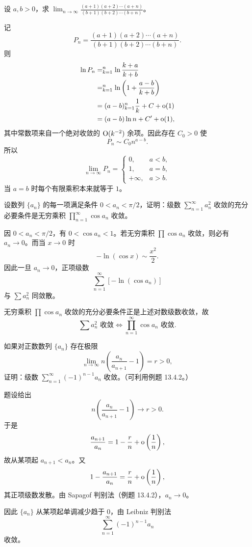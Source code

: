 \begin{xexercise}[2]
设 $a,b>0$，求 $\lim_{n\to\infty}\frac{(a+1)(a+2)\cdots(a+n)}{(b+1)(b+2)\cdots(b+n)}$。
\end{xexercise}
\begin{xsolution}
记
\[
 P_n=\frac{(a+1)(a+2)\cdots(a+n)}{(b+1)(b+2)\cdots(b+n)}.
\]
则
\[
 \begin{aligned}
 \ln P_n
 &=\relax_{k=1}^{n}\ln\frac{k+a}{k+b}\\
 &=\relax_{k=1}^{n}\ln\left(1+\frac{a-b}{k+b}\right)\\
 &=(a-b)\relax_{k=1}^{n}\frac1k+C+\mathrm{o}(1)\\
 &=(a-b)\ln n+C'+\mathrm{o}(1),
 \end{aligned}
\]
其中常数项来自一个绝对收敛的 $\relax\mathrm{O}(k^{-2})$ 余项。因此存在 $C_0>0$ 使
\[
 P_n\sim C_0n^{a-b}.
\]
所以
\[
 \boxed{
 \lim_{n\to\infty}P_n=
 \begin{cases}
 0,&a<b,\\
 1,&a=b,\\
 +\infty,&a>b.
 \end{cases}}
\]
当 $a=b$ 时每个有限乘积本来就等于 $1$。
\end{xsolution}


\begin{xexercise}[3]
设数列 $\{a_n\}$ 的每一项满足条件 $0<a_n<\pi/2$，证明：级数 $\sum_{n=1}^{\infty}a_n^2$ 收敛的充分必要条件是无穷乘积 $\prod_{n=1}^{\infty}\cos a_n$ 收敛。
\end{xexercise}
\begin{xsolution}
因 $0<a_n<\pi/2$，有 $0<\cos a_n<1$。若无穷乘积 $\prod\cos a_n$ 收敛，则必有 $a_n\to0$。而当 $x\to0$ 时
\[
 -\ln(\cos x)\sim\frac{x^2}{2}.
\]
因此一旦 $a_n\to0$，正项级数
\[
 \sum_{n=1}^{\infty}[-\ln(\cos a_n)]
\]
与 $\sum a_n^2$ 同敛散。

无穷乘积 $\prod\cos a_n$ 收敛的充分必要条件正是上述对数级数收敛，故
\[
 \boxed{\sum a_n^2\text{ 收敛}\Longleftrightarrow\prod_{n=1}^{\infty}\cos a_n\text{ 收敛}.}
\]
\end{xsolution}


\begin{xexercise}[4]
如果对正数数列 $\{a_n\}$ 存在极限
\[
\lim_{n\to\infty}n\left(\frac{a_n}{a_{n+1}}-1\right)=r>0,
\]
证明：级数 $\sum_{n=1}^{\infty}(-1)^{n-1}a_n$ 收敛。（可利用例题 13.4.2。）
\end{xexercise}
\begin{xsolution}
题设给出
\[
 n\left(\frac{a_n}{a_{n+1}}-1\right)\to r>0.
\]
于是
\[
 \frac{a_{n+1}}{a_n}=1-\frac r n+\mathrm{o}\left(\frac1n\right),
\]
故从某项起 $a_{n+1}<a_n$。又
\[
 1-\frac{a_{n+1}}{a_n}
 =\frac r n+\mathrm{o}\left(\frac1n\right),
\]
其正项级数发散。由 Sapagof 判别法（例题 13.4.2），$a_n\to0$。

因此 $\{a_n\}$ 从某项起单调减少趋于 $0$，由 Leibniz 判别法
\[
 \sum_{n=1}^{\infty}(-1)^{n-1}a_n
\]
收敛。
\end{xsolution}


